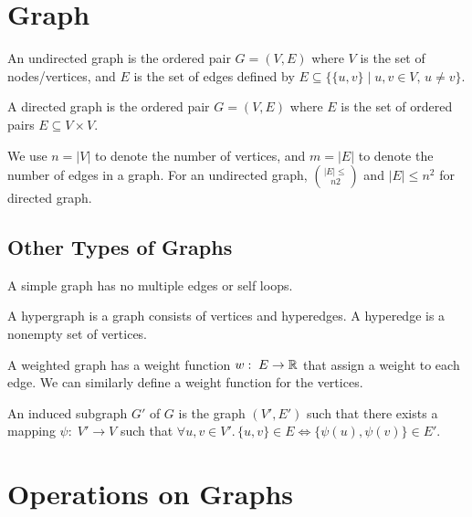 \section{Graph}

\vspace{\parskip}

\begin{definition} 
    An undirected graph is the ordered pair $G=(V,E)$ where $V$ is the set of nodes/vertices, and $E$ is the set of edges defined by $E \subseteq \{ \{u,v\} \mid u,v \in V,\, u \neq v \}$.
\end{definition}

\begin{definition} 
    A directed graph is the ordered pair $G=(V,E)$ where $E$ is the set of ordered pairs $E \subseteq V \times V$.
\end{definition}

We use $n = |V|$ to denote the number of vertices, and $m = |E|$ to denote the number of edges in a graph. For an undirected graph, $|E| \leq \choose{n 2}$ and $|E| \leq n^2$ for directed graph. 

\subsection{Other Types of Graphs}   

A simple graph has no multiple edges or self loops.

A hypergraph is a graph consists of vertices and hyperedges. A hyperedge is a nonempty set of vertices.

A weighted graph has a weight function $w:\; E \to \mathbb{R}$ that assign a weight to each edge. We can similarly define a weight function for the vertices.

An induced subgraph $G'$ of $G$ is the graph $(V',E')$ such that there exists a mapping $\psi:\; V' \to V$ such that $\forall u,v \in V'.\, \{u,v\} \in E \iff \{\psi(u), \psi(v)\} \in E'$. 

\section{Operations on Graphs}

